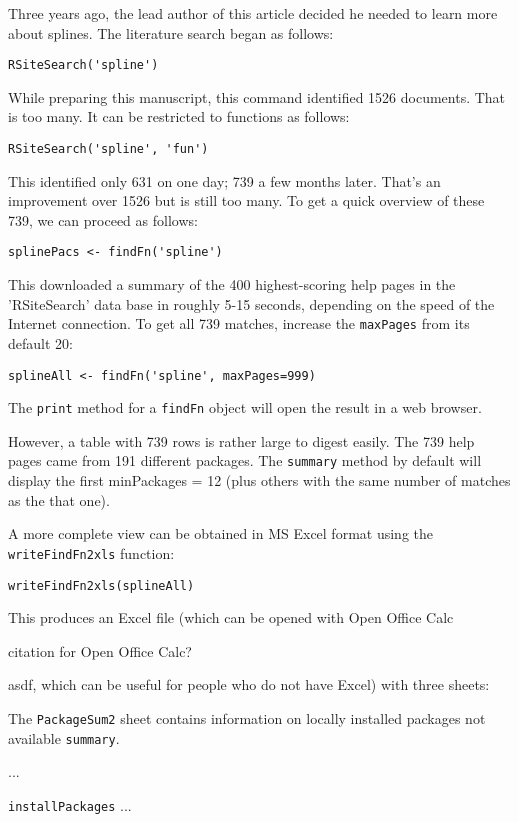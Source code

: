 Three years ago, the lead author of this article decided he 
needed to learn 
more about splines.  The literature search began as follows:  
\begin{verbatim}
RSiteSearch('spline')
\end{verbatim}
While preparing this manuscript, this command identified 1526
documents.  That is too many.  It can be restricted to 
functions as follows:  
\begin{verbatim}
RSiteSearch('spline', 'fun')
\end{verbatim}
This identified only 631 on one day;  739 a few months later.  
That's an improvement over 1526 but is
still too many.  To get a quick overview of these 739, we can
proceed as follows:
\begin{verbatim}
splinePacs <- findFn('spline')
\end{verbatim}
This downloaded a summary of the 400 highest-scoring help pages in
the 'RSiteSearch' data base in roughly 5-15 seconds, depending on the
speed of the Internet connection.  To get all 739 matches, increase 
the {\tt maxPages} from its default 20:  
\begin{verbatim}
splineAll <- findFn('spline', maxPages=999)
\end{verbatim}
The {\tt print} method for a {\tt findFn} object 
will open the result in a web browser.

However, a table with 739 rows is rather large to digest easily.
The 739 help pages came from 191 different packages.  The 
{\tt summary} method by default will display the first 
minPackages = 12 (plus others with the same number of matches as 
the that one).  

A more complete view can be obtained in MS Excel format 
using the {\tt writeFindFn2xls} function:  
\begin{verbatim}
writeFindFn2xls(splineAll)
\end{verbatim}
This produces an Excel file (which can be opened with Open Office
Calc

citation for Open Office Calc?

asdf, which can be useful for people who do not have Excel) with
three sheets:

The {\tt PackageSum2} sheet contains information on locally installed 
packages not available {\tt summary}.  

...

{\tt installPackages} ... 






